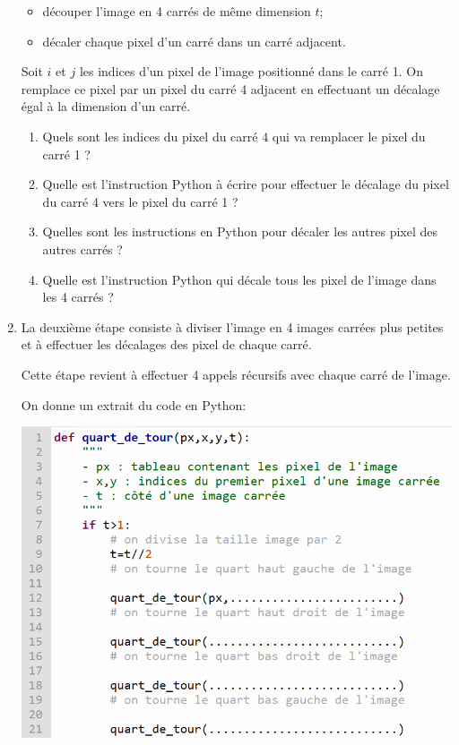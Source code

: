 \documentclass[11pt,a4paper]{article}
\newcounter{num}
\newcounter{rem}
\begin{document}
\begin{enumerate}
\begin{itemize}
\item découper l'image en 4 carrés de même dimension $t$;

\item décaler chaque pixel d'un carré dans un carré adjacent.

\end{itemize}

Soit $i$ et $j$ les indices d'un pixel de l'image positionné dans le carré 1. On remplace ce pixel par un pixel du carré 4 adjacent en effectuant un décalage égal à la dimension d'un carré.

\begin{enumerate}

\item Quels sont les indices du pixel du carré 4 qui va remplacer le pixel du carré 1 ? \vspace{1.5cm}

\item Quelle est l'instruction Python à écrire pour effectuer le décalage du pixel du carré 4 vers le pixel du carré 1 ? \vspace{1.5cm}

\item Quelles sont les instructions en Python pour décaler les autres pixel des autres carrés ?\vspace{1.5cm}

\item Quelle est l'instruction Python qui décale tous les pixel de l'image dans les 4 carrés ? \vspace{2.5cm}
\end{enumerate}


\newpage
\item La deuxième étape consiste à diviser l'image en 4 images carrées plus petites et à effectuer les décalages des pixel de chaque carré.

Cette étape revient à effectuer 4 appels récursifs avec chaque carré de l'image.

On donne un extrait du code en Python:

\begin{flushleft}
\includegraphics[scale=0.8]{../img/quart_tour_recursif.png}
\end{flushleft}


\end{enumerate}
\end{document}
